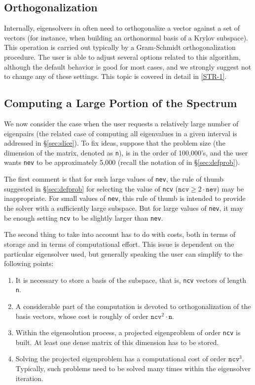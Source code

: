 \subsection{Orthogonalization}
\label{sec:orthog}

	Internally, eigensolvers in  often need to orthogonalize a vector against a set of vectors (for instance, when building an orthonormal basis of a Krylov subspace). This operation is carried out typically by a Gram-Schmidt orthogonalization procedure. The user is able to adjust several options related to this algorithm, although the default behavior is good for most cases, and we strongly suggest not to change any of these settings. This topic is covered in detail in \hyperlink{str}{[STR-1]}.

\subsection{Computing a Large Portion of the Spectrum}
\label{sec:large-nev}

We now consider the case when the user requests a relatively large number of eigenpairs (the related case of computing all eigenvalues in a given interval is addressed in \S\ref{sec:slice}). To fix ideas, suppose that the problem size (the dimension of the matrix, denoted as \texttt{n}), is in the order of 100,000's, and the user wants \texttt{nev} to be approximately 5,000 (recall the notation of  in \S\ref{sec:defprob}).

The first comment is that for such large values of \texttt{nev}, the rule of thumb suggested in \S\ref{sec:defprob} for selecting the value of \texttt{ncv} ($\mathtt{ncv}\geq2\cdot\mathtt{nev}$) may be inappropriate. For small values of \texttt{nev}, this rule of thumb is intended to provide the solver with a sufficiently large subspace. But for large values of \texttt{nev}, it may be enough setting \texttt{ncv} to be slightly larger than \texttt{nev}.

The second thing to take into account has to do with costs, both in terms of storage and in terms of computational effort. This issue is dependent on the particular eigensolver used, but generally speaking the user can simplify to the following points:
\begin{enumerate}
\item It is necessary to store a basis of the subspace, that is, \texttt{ncv} vectors of length \texttt{n}.
\item A considerable part of the computation is devoted to orthogonalization of the basis vectors, whose cost is roughly of order $\mathtt{ncv}^2\cdot\mathtt{n}$.
\item Within the eigensolution process, a projected eigenproblem of order \texttt{ncv} is built. At least one dense matrix of this dimension has to be stored.
\item Solving the projected eigenproblem has a computational cost of order $\mathtt{ncv}^3$. Typically, such problems need to be solved many times within the eigensolver iteration.
\end{enumerate}

